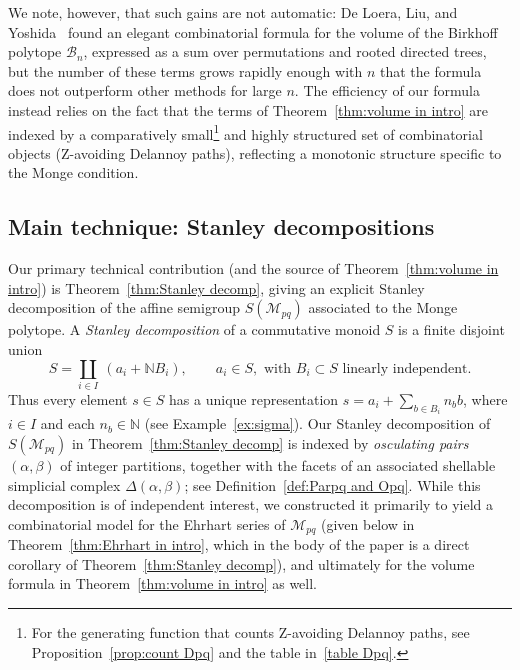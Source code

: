 \documentclass[noamsfonts,10pt]{amsart}
\newcommand{\N}{\mathbb{N}}
\newcommand{\M}{\mathcal{M}}
\newcommand{\al}{\alpha}
\newcommand{\be}{\beta}
\newcommand{\1}{\mathbf{1}}
\theoremstyle{plain}
\theoremstyle{definition}
\numberwithin{equation}{section}
\begin{document}
We note, however, that such gains are not automatic: 
De Loera, Liu, and Yoshida~\cite{DLY09} found an elegant combinatorial formula for the volume of the Birkhoff polytope $\mathcal{B}_n$, expressed as a sum over permutations and rooted directed trees, but the number of these terms grows rapidly enough with $n$ that the formula does not outperform other methods for large $n$.
The efficiency of our formula instead relies on the fact that the terms of Theorem~\ref{thm:volume in intro} are indexed by a comparatively small\footnote{For the generating function that counts Z-avoiding Delannoy paths, see Proposition~\ref{prop:count Dpq} and the table in~\eqref{table Dpq}.} 
and highly structured set of
combinatorial objects (Z-avoiding Delannoy paths), reflecting a monotonic structure specific to the Monge condition.

\subsection*{Main technique: Stanley decompositions}

Our primary technical contribution (and the source of Theorem~\ref{thm:volume in intro}) is Theorem~\ref{thm:Stanley decomp}, giving an explicit Stanley decomposition of the affine semigroup $S(\M_{pq})$ associated to the Monge polytope.
A \emph{Stanley decomposition} of a commutative monoid $S$ is a finite disjoint union
\[
    S = \coprod_{i \in I} \: (a_i + \N B_i), \qquad a_i \in S, \text{ with $B_i \subset S$ linearly independent}.
\]
Thus every element $s \in S$ has a unique representation $s = a_i + \sum_{b \in B_i} n_b b$, where $i \in I$ and each $n_b \in \N$ (see Example~\ref{ex:sigma}).
Our Stanley decomposition of $S(\M_{pq})$ in Theorem~\ref{thm:Stanley decomp} is indexed by \emph{osculating pairs} $(\al, \be)$ of integer partitions, together with the facets of an associated shellable simplicial complex $\Delta(\al, \be)$; see Definition~\ref{def:Parpq and Opq}.
While this decomposition is of independent interest, we constructed it primarily to yield a combinatorial model for the Ehrhart series of $\M_{pq}$ (given below in Theorem~\ref{thm:Ehrhart in intro}, which in the body of the paper is a direct corollary of Theorem~\ref{thm:Stanley decomp}), and ultimately for the volume formula in Theorem~\ref{thm:volume in intro} as well.
\end{document}
